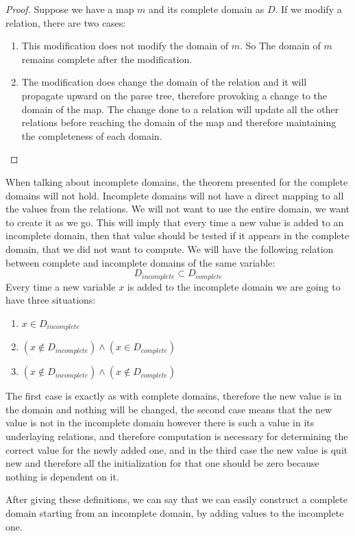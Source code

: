 \documentclass[12pt]{article}
\begin{document}
\begin{proof}
Suppose we have a map $m$ and its complete domain as $D$. If we modify a relation, there are two cases:
\begin{enumerate}
\item This modification does not modify the domain of $m$. So The domain of $m$ remains complete after the modification.
\item The modification does change the domain of the relation and it will propagate upward on the parse tree, therefore provoking a change to the domain of the map. The change done to a relation will update all the other relations before reaching the domain of the map and therefore maintaining the completeness of each domain.
\end{enumerate}
\end{proof}
When talking about incomplete domains, the theorem presented for the complete domains will not hold. Incomplete domains will not have a direct mapping to all the values from the relations. We will not want to use the entire domain, we want to create it as we go. This will imply that every time a new value is added to an incomplete domain, then that value should be tested if it appears in the complete domain, that we did not want to compute. We will have the following relation between complete and incomplete domains of the same variable: $$D_{incomplete}\subset D_{complete}$$
Every time a new variable $x$ is added to the incomplete domain we are going to have three situations: 
\begin{enumerate}
\item $x\in D_{incomplete}$
\item $(x\notin D_{incomplete})\land(x\in D_{complete})$
\item $(x\notin D_{incomplete})\land(x\notin D_{complete})$
\end{enumerate}
The first case is exactly as with complete domains, therefore the new value is in the domain and nothing will be changed, the second case means that the new value is not in the incomplete domain however there is such a value in its underlaying relations, and therefore computation is necessary for determining the correct value for the newly added one, and in the third case the new value is quit new and therefore all the initialization for that one should be zero because nothing is dependent on it.

After giving these definitions, we can say that we can easily construct a complete domain starting from an incomplete domain, by adding values to the incomplete one. 
\end{document}
